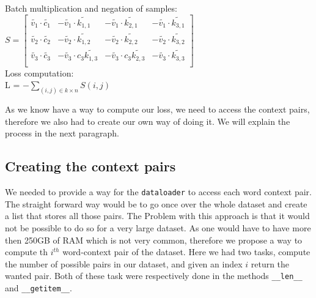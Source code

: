 Batch multiplication and negation of samples:\\
$S = \begin{bmatrix}
\tilde{v_1} \cdot  \tilde{c_1} & -\tilde{v_1} \cdot \tilde{k_{1,1}} & -\tilde{v_1} \cdot  \tilde{k_{2,1}}& -\tilde{v_1} \cdot  \tilde{k_{3,1}}\\
\tilde{v_2} \cdot \tilde{c_2} & -\tilde{v_2} \cdot \tilde{k_{1,2}} & -\tilde{v_2} \cdot \tilde{k_{2,2}} & -\tilde{v_2} \cdot \tilde{k_{3,2}}\\
\tilde{v_3} \cdot \tilde{c_3} &-\tilde{v_3} \cdot c_3  \tilde{k_{1,3}} & -\tilde{v_3} \cdot c_3 \tilde{k_{2,3}}&-\tilde{v_3} \cdot \tilde{k_{3,3}}\\
\end{bmatrix}$\\

Loss computation: \\
 L = $- \sum_{(i,j) \in k \times n} S(i,j) $
 
As we know have a way to compute our loss, we need to access the context pairs, therefore we also had to create our own way of doing it. We will explain the process in the next paragraph.

\subsection{Creating the context pairs}
We needed to provide a way for the \texttt{dataloader} to access each word context pair. The straight forward way would be to go once over the whole dataset and create a list that stores all those pairs. The Problem with this approach is that it would not be possible to do so for a very large dataset. As one would have to have more then 250GB of RAM which is not very common, therefore we propose a way to compute th $i^{th}$ word-context pair of the dataset. Here we had two tasks, compute the number of possible pairs in our dataset, and given an index $i$ return the wanted pair. Both of these task were respectively done in the methods \texttt{\_\_len\_\_} and \texttt{\_\_getitem\_\_}.

